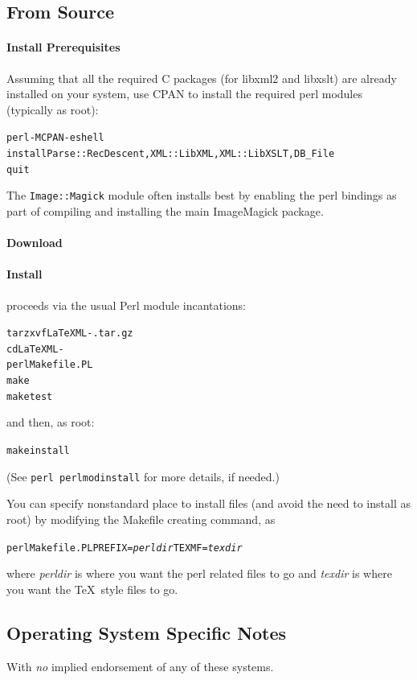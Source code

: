 \documentclass{article}
\begin{document}
\subsection{From Source}\label{install.source}
\paragraph{Install Prerequisites}
Assuming that all the required C packages (for libxml2 and libxslt) are already installed on your system,
  use CPAN to install the required perl modules (typically as root):
\begin{alltt}
   perl -MCPAN -e shell
   install Parse::RecDescent, XML::LibXML, XML::LibXSLT, DB_File
   quit
\end{alltt}
The \texttt{Image::Magick} module often installs best by enabling the
perl bindings as part of compiling and installing the main ImageMagick package.

\paragraph{Download} \CurrentTarball
\paragraph{Install} proceeds via the usual Perl module incantations:
\begin{alltt}
   tar zxvf LaTeXML-\CurrentVersion.tar.gz\\
   cd LaTeXML-\CurrentVersion\\
   perl Makefile.PL
   make
   make test
\end{alltt}
and then, as root:
\begin{alltt}
   make install
\end{alltt}
(See \texttt{perl perlmodinstall} for more details, if needed.)

You can specify nonstandard place to install files (and avoid the need to install as root)
by modifying the Makefile creating command, as
\begin{alltt}
   perl Makefile.PL PREFIX=\emph{perldir} TEXMF=\emph{texdir}
\end{alltt}
where \emph{perldir} is where you want the perl related files to go and
\emph{texdir} is where you want the \TeX\ style files to go.

\subsection[OS-Specific Notes]{Operating System Specific Notes}\label{install.osnotes}
With \emph{no} implied endorsement of any of these systems.
\end{document}
